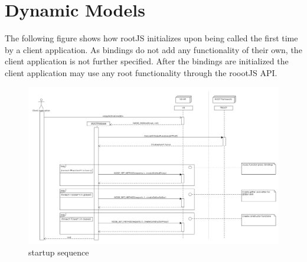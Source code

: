 \section{Dynamic Models}
The following figure shows how rootJS initializes upon being called the first time by a client application. As bindings do not add any functionality of their own, the client application is not further specified. After the bindings are initialized the client application may use any root functionality through the roootJS API.
\begin{figure}[htb]
	\centering
	\includegraphics[width=18cm]{./latex/resources/startupSequence.png}
	\caption{startup sequence}
\end{figure}
